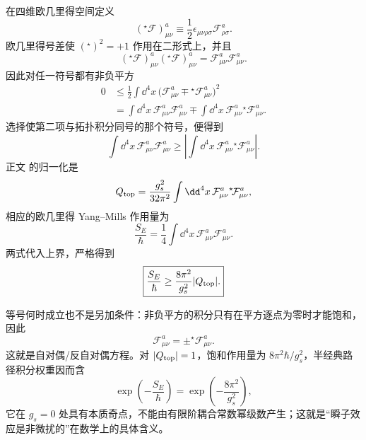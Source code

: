 \begin{derivation}
在四维欧几里得空间定义
\[
({}^\star\!\mathcal F)_{\mu\nu}^a
\equiv\frac12\epsilon_{\mu\nu\rho\sigma}
\mathcal F_{\rho\sigma}^a.
\]
欧几里得号差使 $({}^\star)^2=+1$ 作用在二形式上，并且
\[
({}^\star\!\mathcal F)_{\mu\nu}^a
({}^\star\!\mathcal F)_{\mu\nu}^a
=\mathcal F_{\mu\nu}^a\mathcal F_{\mu\nu}^a.
\]
因此对任一符号都有非负平方
\begin{align*}
0
&\le\frac12\int\dd^4x\,
\bigl(\mathcal F_{\mu\nu}^a
\mp{}^\star\!\mathcal F_{\mu\nu}^a\bigr)^2\\
&=\int\dd^4x\,
\mathcal F_{\mu\nu}^a\mathcal F_{\mu\nu}^a
\mp\int\dd^4x\,
\mathcal F_{\mu\nu}^a{}^\star\!\mathcal F_{\mu\nu}^a.
\end{align*}
选择使第二项与拓扑积分同号的那个符号，便得到
\[
\int\dd^4x\,
\mathcal F_{\mu\nu}^a\mathcal F_{\mu\nu}^a
\ge
\left|
\int\dd^4x\,
\mathcal F_{\mu\nu}^a{}^\star\!\mathcal F_{\mu\nu}^a
\right|.
\]
正文 的归一化是
\[
Q_{\rm top}
=\frac{g_s^2}{32\pi^2}
\int\dd^4x\,
\mathcal F_{\mu\nu}^a{}^\star\!\mathcal F_{\mu\nu}^a,
\]
相应的欧几里得 Yang--Mills 作用量为
\[
\frac{S_E}{\hbar}
=\frac14\int\dd^4x\,
\mathcal F_{\mu\nu}^a\mathcal F_{\mu\nu}^a.
\]
两式代入上界，严格得到
\[
\boxed{
\frac{S_E}{\hbar}
\ge\frac{8\pi^2}{g_s^2}|Q_{\rm top}|.}
\]

等号何时成立也不是另加条件：非负平方的积分只有在平方逐点为零时才能饱和，因此
\[
\mathcal F_{\mu\nu}^a
=\pm{}^\star\!\mathcal F_{\mu\nu}^a.
\]
这就是自对偶/反自对偶方程。对 $|Q_{\rm top}|=1$，饱和作用量为 $8\pi^2\hbar/g_s^2$，半经典路径积分权重因而含
\[
\exp\!\left(-\frac{S_E}{\hbar}\right)
=\exp\!\left(-\frac{8\pi^2}{g_s^2}\right),
\]
它在 $g_s=0$ 处具有本质奇点，不能由有限阶耦合常数幂级数产生；这就是“瞬子效应是非微扰的”在数学上的具体含义。
\end{derivation}

